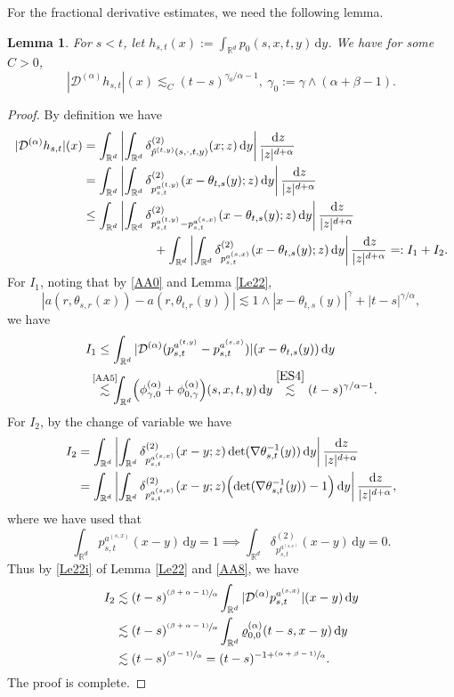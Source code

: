 \documentclass[JEP,XML,SOM,Unicode,published]{cedram}
\newcommand{\psfrac}[2]{\sfrac{(#1)}{#2}}
\newcommand{\sm}[1]{\makebox[0pt][c]{\scriptsize#1}}
\theoremstyle{plain}
\newtheorem{lemma}[theorem]{Lemma}
\theoremstyle{definition}
\newcommand\cD{{\mathcal D}}
\newcommand\mR{\mathbb{R}}
\newcommand\1{{\mathbf{1}}}
\newcommand{\dif}{\,\mathrm{d}}
\begin{document}
For the fractional derivative estimates, we need the following lemma.
\begin{lemma}\label{Le34}
For $s<t$, let $h_{s,t}(x):=\int_{\mR^d}p_0(s,x,t,y)\dif y$. We have for some $C>0$,
\[
|\cD^{(\alpha)}h_{s,t}|(x)\lesssim_C(t-s)^{\gamma_0/\alpha-1},\ \gamma_0:=\gamma \wedge (\alpha+\beta-1).
\]
\end{lemma}
\begin{proof}
By definition we have
\begin{align*}
|\cD^{(\alpha)}h_{s,t}|(x)
&=\int_{\mR^d}\left|\int_{\mR^d}\delta^{(2)}_{\tilde p^{(t,y)}(s,\cdot,t,y)}(x;z)\dif y\right|\frac{\dif z}{|z|^{d+\alpha}}
\\&=\int_{\mR^d}\left|\int_{\mR^d}\delta^{(2)}_{p_{{s,t}}^{a^{(t,y)}}}(x-\theta_{t,s}(y);z)\dif y\right|\frac{\dif z}{|z|^{d+\alpha}}
\\&\leq\int_{\mR^d}\left|\int_{\mR^d}\delta^{(2)}_{p_{{s,t}}^{a^{(t,y)}}-p_{{s,t}}^{a^{(s,x)}}} (x-\theta_{t,s}(y);z)\dif y\right|\frac{\dif z}{|z|^{d+\alpha}}
\\&\hspace*{2cm}+\int_{\mR^d}\left|\int_{\mR^d}\delta^{(2)}_{p_{{s,t}}^{a^{(s,x)}}}(x-\theta_{t,s}(y);z)\dif y\right|\frac{\dif z}{|z|^{d+\alpha}}=:I_1+I_2.
\end{align*}
For $I_1$, noting that by \eqref{AA0} and Lemma \ref{Le22},
\[
|a(r,\theta_{s,r}(x))-a(r,\theta_{t,r}(y))|\lesssim 1\wedge |x-\theta_{t,s}(y)|^{\gamma}+|t-s|^{\gamma/\alpha},
\]
we have
\begin{align*}
I_1&\leq\int_{\mR^d}|\cD^{(\alpha)}(p_{s,t}^{a^{(t,y)}}-p_{s,t}^{a^{(s,x)}})|(x-\theta_{t,s}(y))\dif y
\\&\overset{\sm{\eqref{AA5}}}{\lesssim}\int_{\mR^d}\Bigl(\phi^{(\alpha)}_{\gamma,0}+\phi^{(\alpha)}_{0,\gamma}\Bigr)(s,x,t,y)\dif y
\overset{\eqref{ES4}}{\lesssim} (t-s)^{\gamma/\alpha-1}.
\end{align*}
For $I_2$, by the change of variable we have
\begin{align*}
I_2&=\int_{\mR^d}\left|\int_{\mR^d}\delta^{(2)}_{p_{s,t}^{a^{(s,x)}}}(x-y;z)\det(\nabla\theta^{-1}_{s,t}(y))\dif y\right|\frac{\dif z}{|z|^{d+\alpha}}
\\&=\int_{\mR^d}\left|\int_{\mR^d}\delta^{(2)}_{p_{s,t}^{a^{(s,x)}}}(x-y;z)\Bigl(\det(\nabla\theta^{-1}_{s,t}(y))-1\Bigr)\dif y\right|\frac{\dif z}{|z|^{d+\alpha}},
\end{align*}
where we have used that
\[
\int_{\mR^d}p_{s,t}^{a^{(s,x)}} (x-y)\dif y=1\implies \int_{\mR^d}\delta^{(2)}_{p_{s,t}^{a^{(s,x)}}}(x-y)\dif y=0.
\]
Thus by \eqref{Le22i} of Lemma \ref{Le22} and \eqref{AA8}, we have
\begin{align*}
I_2&\lesssim(t-s)^{\psfrac{\beta+\alpha-1}{\alpha}}\int_{\mR^d}|\cD^{(\alpha)}p_{s,t}^{a^{(s,x)}}|(x-y)\dif y
\\&\lesssim(t-s)^{\psfrac{\beta+\alpha-1}{\alpha}}\int_{\mR^d}\varrho^{(\alpha)}_{0,0}(t-s,x-y)\dif y\\
&\lesssim(t-s)^{\psfrac{\beta-1}{\alpha}}=(t-s)^{-1+\psfrac{\alpha+\beta-1}{\alpha}}.
\end{align*}
The proof is complete.
\end{proof}
\end{document}
